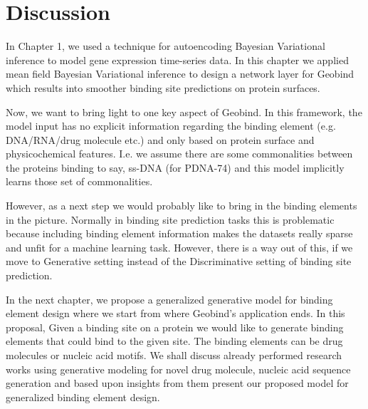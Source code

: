 \section{Discussion}
In Chapter 1, we used a technique for autoencoding Bayesian Variational inference to model gene
expression time-series data. In this chapter we applied mean field Bayesian Variational inference to
design a network layer for Geobind which results into smoother binding site predictions on protein
surfaces. 

Now, we want to bring light to one key aspect of Geobind. In this framework, the model input has no
explicit information regarding the binding element (e.g. DNA/RNA/drug molecule etc.) and only based on
protein surface and physicochemical features. I.e. we assume there are some commonalities between the proteins binding to
say, ss-DNA (for PDNA-74) and this model implicitly learns those set of commonalities.

However, as a next step we would probably like to bring in the binding elements in the
picture. Normally in binding site prediction tasks this is problematic because including binding
element information makes the
datasets really sparse and unfit for a machine learning task. However, there is a way out of this,
if we move to Generative setting instead of the Discriminative setting of binding site prediction.

In the next chapter, we propose a generalized generative model for  binding element design where we
start from where Geobind's application ends. In this proposal, Given a binding site on a protein we
would like to generate binding elements that could bind to the given site. The binding elements
can be drug molecules or nucleic acid motifs. We shall discuss already performed research works
using generative modeling for novel drug molecule, nucleic acid sequence generation and based upon
insights from them present our proposed model for generalized binding element design.
